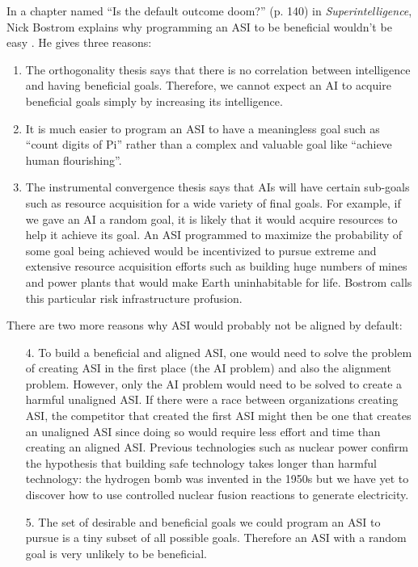 \documentclass{article}
\begin{document}
In a chapter named “Is the default outcome doom?” (p. 140) in \textit{Superintelligence}, Nick Bostrom explains why programming an ASI to be beneficial wouldn’t be easy \cite{superintelligence}. He gives three reasons:

\begin{enumerate}
\item The orthogonality thesis says that there is no correlation between intelligence and having beneficial goals. Therefore, we cannot expect an AI to acquire beneficial goals simply by increasing its intelligence.

\item It is much easier to program an ASI to have a meaningless goal such as “count digits of Pi” rather than a complex and valuable goal like “achieve human flourishing”.

\item The instrumental convergence thesis says that AIs will have certain sub-goals such as resource acquisition for a wide variety of final goals. For example, if we gave an AI a random goal, it is likely that it would acquire resources to help it achieve its goal. An ASI programmed to maximize the probability of some goal being achieved would be incentivized to pursue extreme and extensive resource acquisition efforts such as building huge numbers of mines and power plants that would make Earth uninhabitable for life. Bostrom calls this particular risk infrastructure profusion.
\end{enumerate}

There are two more reasons why ASI would probably not be aligned by default:

\begin{enumerate}
\item[4.] To build a beneficial and aligned ASI, one would need to solve the problem of creating ASI in the first place (the AI problem) and also the alignment problem. However, only the AI problem would need to be solved to create a harmful unaligned ASI. If there were a race between organizations creating ASI, the competitor that created the first ASI might then be one that creates an unaligned ASI since doing so would require less effort and time than creating an aligned ASI. Previous technologies such as nuclear power confirm the hypothesis that building safe technology takes longer than harmful technology: the hydrogen bomb was invented in the 1950s but we have yet to discover how to use controlled nuclear fusion reactions to generate electricity.

\item[5.] The set of desirable and beneficial goals we could program an ASI to pursue is a tiny subset of all possible goals. Therefore an ASI with a random goal is very unlikely to be beneficial.
\end{enumerate}
\end{document}
